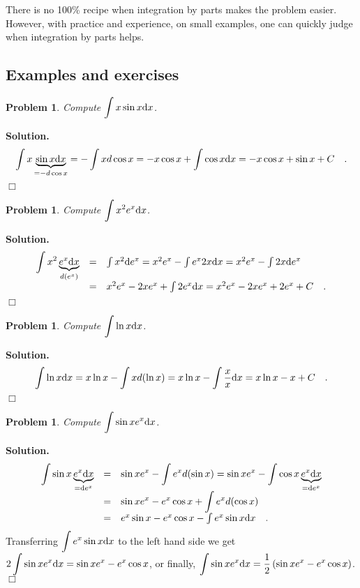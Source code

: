 \documentclass[12pt]{book}
\newenvironment{solution}{\medskip\noindent\textbf{Solution.} }{$\Box$}
\newtheorem{problem}[theorem]{Problem}
\begin{document}
There is no 100\% recipe when integration by parts makes the problem easier. However, with practice and experience, on small examples, one can quickly judge when integration by parts helps.
\subsection{Examples and exercises}
\begin{problem}
Compute $\displaystyle \int x \sin x {\normalfont \text{d}} x$.
\end{problem}
\begin{solution}
\[
\begin{array}{rcl}
\displaystyle\int x \underbrace{\sin x {\normalfont \text{d}} x}_{=-d\cos x} = -\int x d\cos x = -x\cos x + \int \cos x {\normalfont \text{d}} x = -x \cos x +\sin x +C\quad .
\end{array}
\]
\end{solution}
\begin{problem}
Compute $\displaystyle \int x^2 e^x {\normalfont \text{d}} x$.
\end{problem}
\begin{solution}
\[
\begin{array}{rcl}
\displaystyle\int x^2 \underbrace{e^x {\normalfont \text{d}} x}_{d (e^x)} &=& \int x^2 {\normalfont \text{d}} e^x= x^2e^x - \int e^x2x{\normalfont \text{d}} x=  x^2e^x - \int 2x{\normalfont \text{d}} e^x \\
&=& x^2e^x- 2xe^x+ \int 2e^x {\normalfont \text{d}} x= x^2e^x-2xe^x+2e^x+C\quad .
\end{array}
\]
\end{solution}
\begin{problem}
Compute $\displaystyle \int \ln x {\normalfont \text{d}} x $.
\end{problem}
\begin{solution}
\[
\int \ln x {\normalfont \text{d}} x = x\ln x - \int x d(\ln x)= x\ln x -\int \frac{x}{x}{\normalfont \text{d}} x= x\ln x-x+C\quad .
\]
\end{solution}
\begin{problem}
Compute $\displaystyle \int \sin x e^x {\normalfont \text{d}} x$.
\end{problem}
\begin{solution}
\[
\begin{array}{rcl}
\displaystyle\int \sin x \underbrace{e^x {\normalfont \text{d}} x}_{={\normalfont \text{d}} e^x}&=&\displaystyle\sin x e^x - \int e^xd(\sin x)=\sin x e^x - \int \cos x \underbrace{e^x {\normalfont \text{d}} x}_{={\normalfont \text{d}} e^x}\\
&=& \displaystyle\sin x e^x - e^x\cos x +\int e^x d(\cos x) \\
&=& e^x\sin x -e^x\cos x-\int e^x\sin x {\normalfont \text{d}} x\quad .
\end{array}
\]
Transferring $\displaystyle\int e^x\sin x {\normalfont \text{d}} x$ to the left hand side we get $\displaystyle 2\int \sin x e^x {\normalfont \text{d}} x = \sin x e^x-e^x\cos x$, or finally, $\displaystyle \int \sin x e^x {\normalfont \text{d}} x=\frac12 \left(\sin x e^x- e^x\cos x\right)$.
\end{solution}
\end{document}
